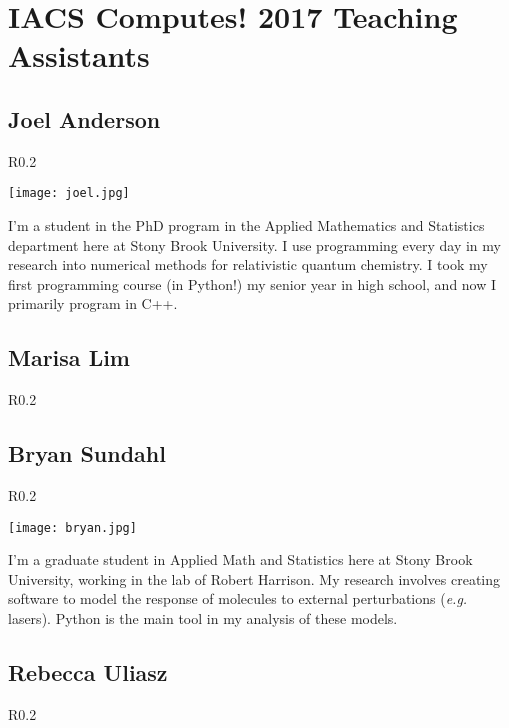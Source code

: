 \documentclass[]{article}
\begin{document}
\section*{IACS Computes! 2017 Teaching Assistants}

\subsection*{Joel Anderson} 
\begin{wrapfigure}[6]{R}{0.2\textwidth}
\begin{centering}
    \texttt{[image: joel.jpg]}
\end{centering}
\end{wrapfigure}
I'm a student in the PhD program in the Applied Mathematics and Statistics department here at Stony Brook University. I use programming every day in my research into numerical methods for relativistic quantum chemistry. I took my first programming course (in Python!) my senior year in high school, and now I primarily program in C++.

\subsection*{Marisa Lim} 
\begin{wrapfigure}[6]{R}{0.2\textwidth}
\end{wrapfigure}



\subsection*{Bryan Sundahl} 
\begin{wrapfigure}[4]{R}{0.2\textwidth}
\begin{centering}
    \texttt{[image: bryan.jpg]}
\end{centering}
\end{wrapfigure}
I'm a graduate student in Applied Math and Statistics here at Stony Brook University, working in the lab of Robert Harrison. My research involves creating software to model the response of molecules to external perturbations (\textit{e.g.} lasers).  Python is the main tool in my analysis of these models. 

\vspace{0.5 in}

\subsection*{Rebecca Uliasz} 
\begin{wrapfigure}{R}{0.2\textwidth}
\end{wrapfigure}
\end{document}
